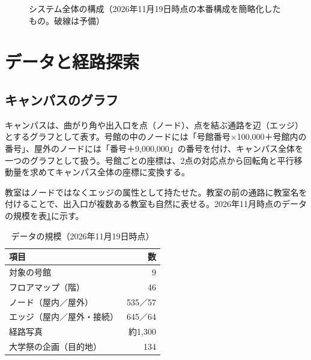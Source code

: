 \documentclass[
  paper=a4paper,
  fontsize=10.5pt,
  jafontsize=10.5pt,
  twocolumn,
  line_length=82.5mm,   %
  column_gap=5mm,
  gutter=20mm,          %
  number_of_lines=35,   %
  head_space=25mm,      %
  baselineskip=20.36pt, %
]{jlreq}
\begin{document}
\begin{figure}[t]
\caption{システム全体の構成（2026年11月19日時点の本番構成を簡略化したもの。破線は予備）}
\label{fig:arch}
\end{figure}

\section{データと経路探索}

\subsection{キャンパスのグラフ}

キャンパスは、曲がり角や出入口を点（ノード）、点を結ぶ通路を辺（エッジ）とするグラフとして表す。号館の中のノードには「号館番号$\times$100{,}000＋号館内の番号」、屋外のノードには「番号＋9{,}000{,}000」の番号を付け、キャンパス全体を一つのグラフとして扱う。号館ごとの座標は、2点の対応点から回転角と平行移動量を求めてキャンパス全体の座標に変換する。

教室はノードではなくエッジの属性として持たせた。教室の前の通路に教室名を付けることで、出入口が複数ある教室も自然に表せる。2026年11月時点のデータの規模を表\ref{tab:data}に示す。

\begin{table}[t]
\centering
\caption{データの規模（2026年11月19日時点）}
\label{tab:data}
\begin{tabular}{lr}
\toprule
項目 & 数 \\
\midrule
対象の号館 & 9 \\
フロアマップ（階） & 46 \\
ノード（屋内／屋外） & 535／57 \\
エッジ（屋内／屋外・接続） & 645／64 \\
経路写真 & 約1{,}300 \\
大学祭の企画（目的地） & 134 \\
\bottomrule
\end{tabular}
\end{table}
\end{document}
